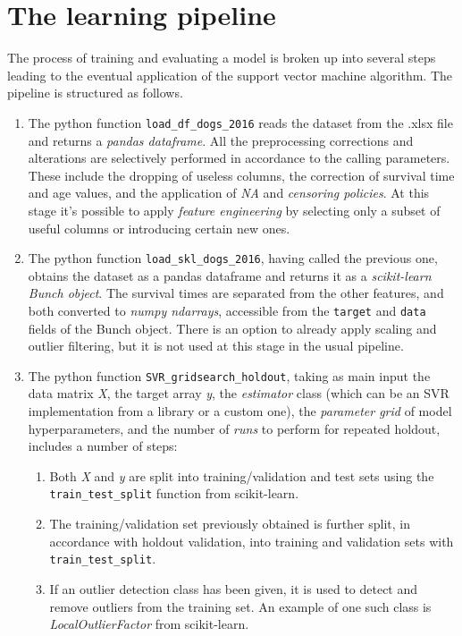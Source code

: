 \documentclass[12pt]{report}
\begin{document}
\section{The learning pipeline}
The process of training and evaluating a model is broken up into several steps leading to the eventual application of the support vector machine algorithm. The pipeline is structured as follows.
\begin{enumerate}
\item The python function \texttt{load\_df\_dogs\_2016} reads the dataset from the .xlsx file and returns a \textit{pandas dataframe}. All the preprocessing corrections and alterations are selectively performed in accordance to the calling parameters. These include the dropping of useless columns, the correction of survival time and age values, and the application of \textit{NA} and \textit{censoring policies}. At this stage it's possible to apply \textit{feature engineering} by selecting only a subset of useful columns or introducing certain new ones.
\item The python function \texttt{load\_skl\_dogs\_2016}, having called the previous one, obtains the dataset as a pandas dataframe and returns it as a \textit{scikit-learn Bunch object}. The survival times are separated from the other features, and both converted to \textit{numpy ndarrays}, accessible from the \texttt{target} and \texttt{data} fields of the Bunch object. There is an option to already apply scaling and outlier filtering, but it is not used at this stage in the usual pipeline.
\item The python function \texttt{SVR\_gridsearch\_holdout}, taking as main input the data matrix \textit{X}, the target array \textit{y}, the \textit{estimator} class (which can be an SVR implementation from a library or a custom one), the \textit{parameter grid} of model hyperparameters, and the number of \textit{runs} to perform for repeated holdout, includes a number of steps:
\begin{enumerate}
\item Both \textit{X} and \textit{y} are split into training/validation and test sets using the \texttt{train\_test\_split} function from scikit-learn.
\item The training/validation set previously obtained is further split, in accordance with holdout validation, into training and validation sets with \texttt{train\_test\_split}.
\item If an outlier detection class has been given, it is used to detect and remove outliers from the training set. An example of one such class is \textit{LocalOutlierFactor} from scikit-learn.

\end{enumerate}
\end{enumerate}
\end{document}

